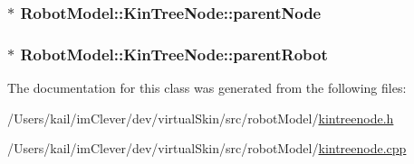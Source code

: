 \label{class_robot_model_1_1_kin_tree_node_acc89f79d42901042ca47a7b56761d4b1}
\hypertarget{class_robot_model_1_1_kin_tree_node_ae708a7912fe1338f03ab9ebb2207a0e7}{
\subsubsection[{parentNode}]{$\ast$ {\bf RobotModel::KinTreeNode::parentNode}}}
\label{class_robot_model_1_1_kin_tree_node_ae708a7912fe1338f03ab9ebb2207a0e7}
\hypertarget{class_robot_model_1_1_kin_tree_node_a135634b0e34e02ded1c61b29ef4d3c02}{
\subsubsection[{parentRobot}]{$\ast$ {\bf RobotModel::KinTreeNode::parentRobot}}}
\label{class_robot_model_1_1_kin_tree_node_a135634b0e34e02ded1c61b29ef4d3c02}


The documentation for this class was generated from the following files:\begin{DoxyCompactItemize}
\item 
/Users/kail/imClever/dev/virtualSkin/src/robotModel/\hyperlink{kintreenode_8h}{kintreenode.h}\item 
/Users/kail/imClever/dev/virtualSkin/src/robotModel/\hyperlink{kintreenode_8cpp}{kintreenode.cpp}\end{DoxyCompactItemize}
